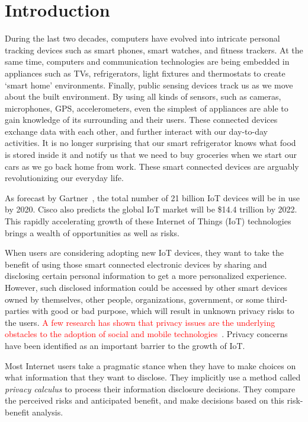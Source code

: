 \chapter{Introduction}\label{chapter:intro}
 
During the last two decades, computers have evolved into intricate personal tracking devices such as smart phones, smart watches, and fitness trackers. At the same time, computers and communication technologies are being embedded in appliances such as TVs, refrigerators, light fixtures and thermostats to create `smart home' environments. Finally, public sensing devices track us as we move about the built environment. By using all kinds of sensors, such as cameras, microphones, GPS, accelerometers, even the simplest of appliances are able to gain knowledge of its surrounding and their users. These connected devices exchange data with each other, and further interact with our day-to-day activities. It is no longer surprising that our smart refrigerator knows what food is stored inside it and notify us that we need to buy groceries when we start our cars as we go back home from work. These smart connected devices are arguably revolutionizing our everyday life.

As forecast by Gartner~\cite{van_der_meulen_gartner_nodate}, the total number of 21 billion IoT devices will be in use by 2020. Cisco also predicts the global IoT market will be \$14.4 trillion by 2022. This rapidly accelerating growth of these Internet of Things (IoT) technologies brings a wealth of opportunities as well as risks. 

When users are considering adopting new IoT devices, they want to take the benefit of using those smart connected electronic devices by sharing and disclosing certain personal information to get a more personalized experience. However, such disclosed information could be accessed by other smart devices owned by themselves, other people, organizations, government, or some third-parties with good or bad purpose, which will result in unknown privacy risks to the users. \textcolor{red}{A few research has shown that privacy issues are the underlying obstacles to the adoption of social and mobile technologies~\cite{}}. Privacy concerns have been identified as an important barrier to the growth of IoT.

Most Internet users take a pragmatic stance when they have to make choices on what information that they want to disclose. They implicitly use a method called \textit{privacy calculus} to process their information disclosure decisions. They compare the perceived risks and anticipated benefit, and make decisions based on this risk-benefit analysis.

